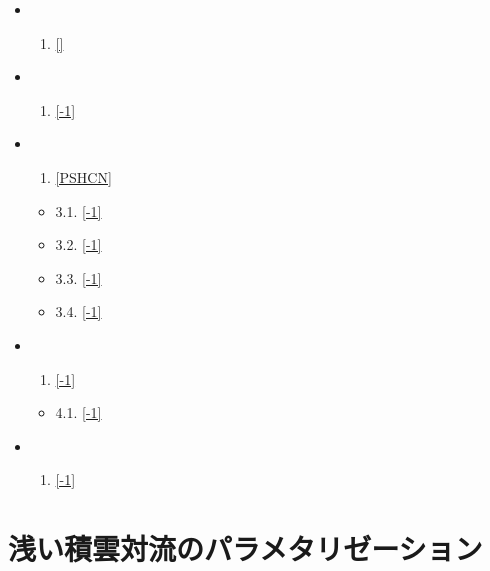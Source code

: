 \begin{itemize}
\item
  \begin{enumerate}
  \def\labelenumi{\arabic{enumi}.}
  \tightlist
  \item
    \ref{}
  \end{enumerate}
\item
  \begin{enumerate}
  \def\labelenumi{\arabic{enumi}.}
  \setcounter{enumi}{1}
  \tightlist
  \item
    \ref{-1}
  \end{enumerate}
\item
  \begin{enumerate}
  \def\labelenumi{\arabic{enumi}.}
  \setcounter{enumi}{2}
  \tightlist
  \item
    \ref{PSHCN}
  \end{enumerate}

  \begin{itemize}
  \tightlist
  \item
    3.1. \ref{-1}
  \item
    3.2. \ref{-1}
  \item
    3.3. \ref{-1}
  \item
    3.4. \ref{-1}
  \end{itemize}
\item
  \begin{enumerate}
  \def\labelenumi{\arabic{enumi}.}
  \setcounter{enumi}{3}
  \tightlist
  \item
    \ref{-1}
  \end{enumerate}

  \begin{itemize}
  \tightlist
  \item
    4.1. \ref{-1}
  \end{itemize}
\item
  \begin{enumerate}
  \def\labelenumi{\arabic{enumi}.}
  \setcounter{enumi}{4}
  \tightlist
  \item
    \ref{-1}
  \end{enumerate}
\end{itemize}

\hypertarget{ux6d45ux3044ux7a4dux96f2ux5bfeux6d41ux306eux30d1ux30e9ux30e1ux30bfux30eaux30bcux30fcux30b7ux30e7ux30f3}{%
\section{浅い積雲対流のパラメタリゼーション}\label{ux6d45ux3044ux7a4dux96f2ux5bfeux6d41ux306eux30d1ux30e9ux30e1ux30bfux30eaux30bcux30fcux30b7ux30e7ux30f3}}

